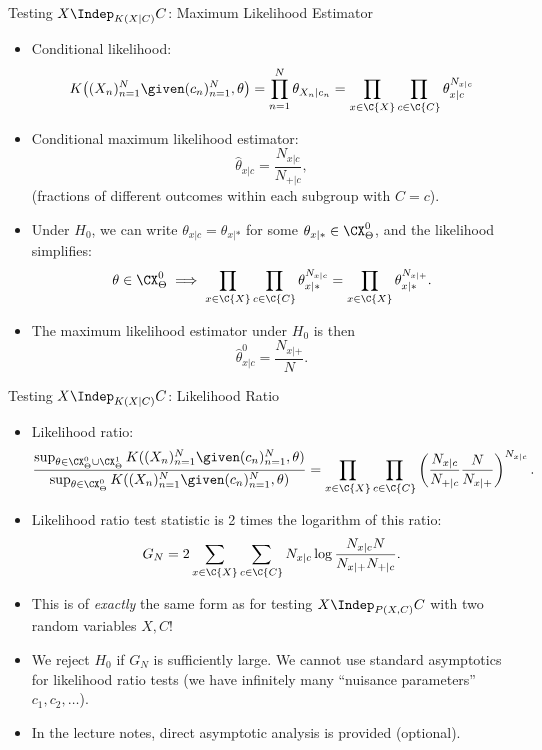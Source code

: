\begin{frame}{Testing $X \Indep_{K(X|C)} C$: Maximum Likelihood Estimator}
  \begin{itemize}
    \item Conditional likelihood:
      $$K\big((X_n)_{n=1}^N \given (c_n)_{n=1}^N, \theta\big)
      = \prod_{n=1}^N \theta_{X_n|c_n} 
      = \prod_{x\in\C{X}} \prod_{c\in\C{C}} \theta_{x|c}^{N_{x|c}}$$
    \item Conditional maximum likelihood estimator:
      $$\hat \theta_{x|c} = \frac{N_{x|c}}{N_{+|c}},$$
      (fractions of different outcomes within each subgroup with $C = c$).
    \item Under $H_0$, we can write $\theta_{x|c} = \theta_{x|\ast}$ for some $\theta_{x|\ast} \in \CX_\Theta^0$, 
      and the likelihood simplifies:
      $$\theta \in \CX_\Theta^0 \implies \prod_{x\in\C{X}} \prod_{c\in\C{C}} \theta_{x|\ast}^{N_{x|c}} = \prod_{x\in\C{X}} \theta_{x|\ast}^{N_{x|+}}.$$
    \item The maximum likelihood estimator under $H_0$ is then
$$\hat \theta^0_{x|c} = \frac{N_{x|+}}{N}.$$
  \end{itemize}
\end{frame}
 
\begin{frame}{Testing $X \Indep_{K(X|C)} C$: Likelihood Ratio}
  \begin{itemize}
    \item Likelihood ratio:
\begin{equation*}
  \frac{\sup_{\theta\in\CX_\Theta^0 \cup \CX_\Theta^1} K((X_n)_{n=1}^N \given (c_n)_{n=1}^N, \theta)}{\sup_{\theta\in\CX_\Theta^0} K((X_n)_{n=1}^N \given (c_n)_{n=1}^N, \theta)}
= \prod_{x\in\C{X}} \prod_{c\in\C{C}} \left(\frac{N_{x|c}}{N_{+|c}} \frac{N}{N_{x|+}}\right)^{N_{x|c}}.
\end{equation*}
    \item Likelihood ratio test statistic is 2 times the logarithm of this ratio:
$$G_N = 2 \sum_{x\in\C{X}} \sum_{c\in\C{C}} N_{x|c} \log \frac{N_{x|c} N}{N_{x|+} N_{+|c}}.$$
    \item This is of \emph{exactly} the same form as for testing $X \Indep_{P(X,C)} C$ with two random variables $X,C$!
    \item We reject $H_0$ if $G_N$ is sufficiently large.
      We cannot use standard asymptotics for likelihood ratio tests (we have infinitely many ``nuisance parameters'' $c_1,c_2,\dots$).
    \item In the lecture notes, direct asymptotic analysis is provided (optional).
  \end{itemize}
\end{frame}

